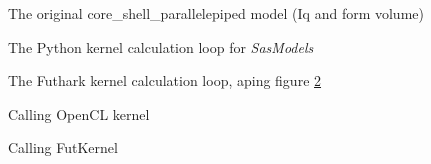 \documentclass[11pt]{article}
\newcommand{\sasmodels}{\textit{SasModels}}
\begin{document}
\begin{figure}
  
  
  \caption{The original core\_shell\_parallelepiped model (Iq and form volume)}
  \label{fig:core_shell}
\end{figure}

\begin{figure}
  
  \caption{The Python kernel calculation loop for \sasmodels}
  \label{fig:kernelpy_loop}
\end{figure}

\begin{figure}
  
  \label{fig:kernelfut_loop}
  \caption{The Futhark kernel calculation loop, aping figure \ref{fig:kernelpy_loop}}
\end{figure}
\begin{figure}
  
  \caption{Calling OpenCL kernel}
  \label{fig:kernelcl_call}
\end{figure}

\begin{figure}
  
  \caption{Calling FutKernel}
  \label{fig:kernelfut_call}
\end{figure}
\end{document}
